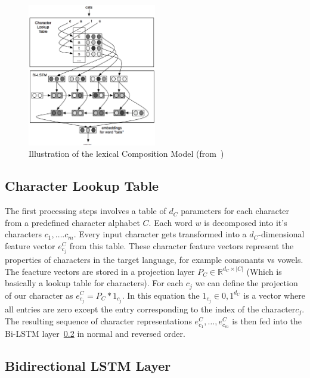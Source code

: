 \begin{figure}
  \begin{center}
    \includegraphics[width=0.5\textwidth]{./img/bi-lstm-emeddings}
  \end{center}
  \caption{Illustration of the lexical Composition Model (from~\cite{DBLP:journals/corr/LingLMAADBT15})}
\end{figure}

\subsection{Character Lookup Table}

The first processing steps involves a table of $d_C$ parameters for each character from a predefined character alphabet $C$.
Each word $w$ is decomposed into it's characters $c_1, \dots. c_m$.
Every input character gets transformed into a $d_C$-dimensional feature vector $e_{c_j}^C$ from this table.
These character feature vectors represent the properties of characters in the target language, for example consonants vs vowels.
The feacture vectors are stored in a projection layer $P_C \in \mathbb{R}^{d_C \times |C|}$ (Which is basically a lookup table for characters).
For each $c_j$ we can define the projection of our character as $e_{c_j}^C = P_C * 1_{c_j}$. In this equation the $1_{c_j} \in {0, 1}^{d_C}$ 
is a vector where all entries are zero except the entry corresponding to the index of the character$c_j$. 
The resulting sequence of character representations $e_{c_1}^C, \dots, e_{c_m}^C$ is then fed into the Bi-LSTM layer~\ref{subsec:bi-lstm}
in normal and reversed order.

\subsection{Bidirectional LSTM Layer}
\label{subsec:bi-lstm}

